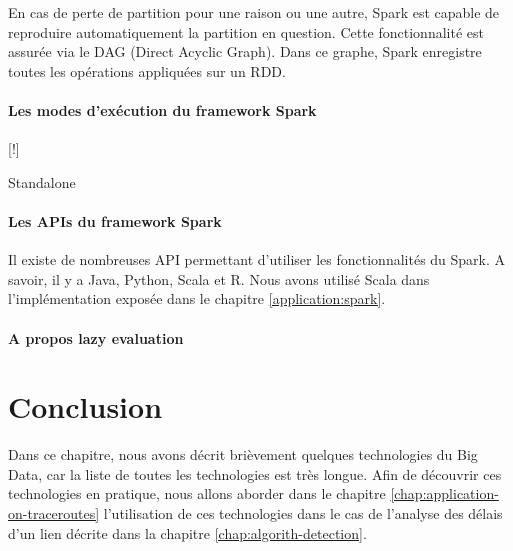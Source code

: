En cas de perte de partition pour une raison ou une autre, Spark est capable de reproduire automatiquement la partition en question. Cette fonctionnalité est assurée via le DAG (Direct Acyclic Graph). Dans ce graphe, Spark enregistre toutes les opérations appliquées sur un RDD.


\paragraph{Les modes d'exécution du framework Spark}\label{modes-sparks}
[!]
\begin{description}
	\item [Standalone]
	
\end{description}

\paragraph{Les APIs du framework Spark}

Il existe de nombreuses API permettant d'utiliser les fonctionnalités du Spark. A savoir, il y a Java, Python, Scala et R. Nous avons utilisé Scala  dans l'implémentation exposée dans le chapitre \ref{application:spark}.


\paragraph{A propos lazy evaluation} \label{lazy-evaluation}


\section{Conclusion}

Dans ce chapitre,  nous avons décrit brièvement  quelques technologies du Big Data, car la liste de toutes les technologies est très longue. Afin de découvrir ces technologies en pratique, nous allons aborder dans le chapitre \ref{chap:application-on-traceroutes} l'utilisation de ces technologies dans le cas de l'analyse des délais d'un lien décrite dans la chapitre \ref{chap:algorith-detection}.    









